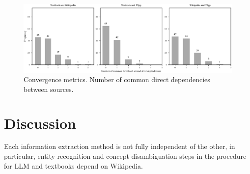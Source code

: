 \documentclass{article}
\begin{document}

\begin{figure}
    \centering
    \includegraphics[width=.95\textwidth]{img/comp_direct_deps.pdf}
    \caption{Convergence metrics. Number of common direct dependencies between sources.}
    \label{fig:comp_direct_deps}
\end{figure}

\section{Discussion}




Each information extraction method is not fully independent of the other, in particular, entity recognition and concept disambiguation steps in the procedure for LLM and textbooks depend on Wikipedia.




\end{document}
